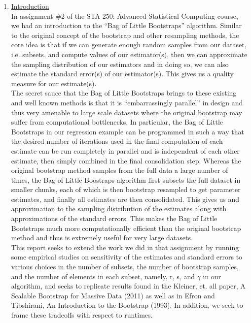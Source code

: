 \documentclass[a4paper, 11pt]{report}
\begin{document}
	\begin{enumerate}
	    \item \Large\underline{Introduction}\normalsize \\
	    
	    	In assignment \#2 of the STA 250: Advanced Statistical Computing course, we had an introduction to the ``Bag of Little Bootstraps'' algorithm.  Similar to the original concept of the bootstrap and other resampling methods, the core idea is that if we can generate enough random samples from our dataset, i.e. subsets, and compute values of our estimator(s), then we can approximate the sampling distribution of our estimators and in doing so, we can also estimate the standard error(s) of our estimator(s).  This gives us a quality measure for our estimate(s).  \\
	    	
	    	The secret sauce that the Bag of Little Bootstraps brings to these existing and well known methods is that it is ``embarrassingly parallel'' in design and thus very amenable to large scale datasets where the original bootstrap may suffer from computational bottlenecks.  In particular, the Bag of Little Bootstraps in our regression example can be programmed in such a way that the desired number of iterations used in the final computation of each estimate can be run completely in parallel and is independent of each other estimate, then simply combined in the final consolidation step.  Whereas the original bootstrap method samples from the full data a large number of times, the Bag of Little Boostraps algorithm first subsets the full dataset in smaller chunks, each of which is then bootstrap resampled to get parameter estimates, and finally all estimates are then consolidated.  This gives us and approximation to the sampling distribution of the estimates along with approximations of the standard errors.  This makes the Bag of Little Bootstraps much more computationally efficient than the original bootstrap method and thus is extremely useful for very large datasets.  \\
	    	
	    	This report seeks to extend the work we did in that assignment by running some empirical studies on sensitivity of the estimates and standard errors to various choices in the number of subsets, the number of bootstrap samples, and the number of elements in each subset, namely, r, s, and $\gamma$ in our algorithm, and seeks to replicate results found in the Kleiner, et. all paper, A Scalable Bootstrap for Massive Data (2011) as well as in Efron and Tibshirani, An Introduction to the Bootstrap (1993).  In addition, we seek to frame these tradeoffs with respect to runtimes. \\
	    	

\end{enumerate}
\end{document}
